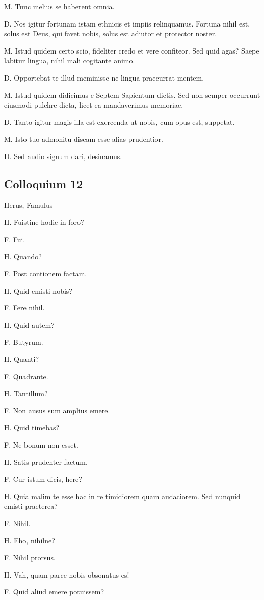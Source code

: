 \documentclass{article}
\begin{document}
M. Tunc melius se haberent omnia.

D. Nos igitur fortunam istam ethnicis et impiis relinquamus. Fortuna nihil est, solus est Deus, qui favet nobis, solus est adiutor et protector noster.

M. Istud quidem certo scio, fideliter credo et vere confiteor. Sed quid agas? Saepe labitur lingua, nihil mali cogitante animo.

D. Opportebat te illud meminisse ne lingua praecurrat mentem.

M. Istud quidem didicimus e Septem Sapientum dictis. Sed non semper occurrunt eiusmodi pulchre dicta, licet ea mandaverimus memoriae.

D. Tanto igitur magis illa est exercenda ut nobis, cum opus est, suppetat.

M. Isto tuo admonitu discam esse alias prudentior.

D. Sed audio signum dari, desinamus.

\subsection{Colloquium 12}
Herus, Famulus

H. Fuistine hodie in foro?

F. Fui.

H. Quando?

F. Post contionem factam.

H. Quid emisti nobis?

F. Fere nihil.

H. Quid autem?

F. Butyrum.

H. Quanti?

F. Quadrante.
 
H. Tantillum?

F. Non ausus sum amplius emere.

H. Quid timebas?

F. Ne bonum non esset.

H. Satis prudenter factum.

F. Cur istum dicis, here?

H. Quia malim te esse hac in re timidiorem quam audaciorem. Sed nunquid emisti praeterea?

F. Nihil.

H. Eho, nihilne?

F. Nihil prorsus.

H. Vah, quam parce nobis obsonatus es!

F. Quid aliud emere potuissem?
\end{document}
